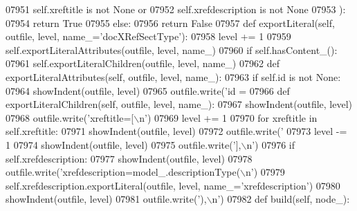 \begin{DoxyCode}
{{{{{{{{{{{{{{{{{{{{{{{{{{{{{{{{{{{{{{{{{{{{{{{{{{{{{{{{{{{{{{{{{{{{{{{{{{{{{{{{{{{{{{{{{{{{{{{{{{{{{{{{{{{{{{{{{{{{{{{{{{{{{{{{{{{{{{{{{{{{{{{{{{{{{{{{{{{{{{{{{{{{{{{{{{{{{{{{{{{{{{{{{{{{{{{{{{{{{{{{{{{{{{{{{{{{{{{{{{{{{{{{{{{{{{{{{{{{{{{{{{{{{{{{{{{{{{{{{{{{{{{{{{{{{{{{{{{{{{{{{{{{{{{{{{{{{{{{{{{{{{{{{{{{{{{{{{{{{{{{{{{{{{{{{{{{{{{{{{{{{{{{{{{{{{{{{{{{{{{{{{{{{{{{{{{{{{{{{{{{{{{{{{{{{{{{{{{{{{{{{{{{{{{{{{{{{{{{{{{{{{{{{{{{{{{{{{{{{{{{{{{{{{{{{{{{{{{{{{{{{{{{{{{{{{{{{{{{{{{{{{{{{{{{{{07951             self.xreftitle \textcolor{keywordflow}{is} \textcolor{keywordflow}{not} \textcolor{keywordtype}{None} \textcolor{keywordflow}{or}
07952             self.xrefdescription \textcolor{keywordflow}{is} \textcolor{keywordflow}{not} \textcolor{keywordtype}{None}
07953             ):
07954             \textcolor{keywordflow}{return} \textcolor{keyword}{True}
07955         \textcolor{keywordflow}{else}:
07956             \textcolor{keywordflow}{return} \textcolor{keyword}{False}
07957     \textcolor{keyword}{def }exportLiteral(self, outfile, level, name\_='docXRefSectType'):
07958         level += 1
07959         self.exportLiteralAttributes(outfile, level, name\_)
07960         \textcolor{keywordflow}{if} self.hasContent_():
07961             self.exportLiteralChildren(outfile, level, name\_)
07962     \textcolor{keyword}{def }exportLiteralAttributes(self, outfile, level, name\_):
07963         \textcolor{keywordflow}{if} self.id \textcolor{keywordflow}{is} \textcolor{keywordflow}{not} \textcolor{keywordtype}{None}:
07964             showIndent(outfile, level)
07965             outfile.write(\textcolor{stringliteral}{'id = %
07966     \textcolor{keyword}{def }exportLiteralChildren(self, outfile, level, name\_):
07967         showIndent(outfile, level)
07968         outfile.write(\textcolor{stringliteral}{'xreftitle=[\(\backslash\)n'})
07969         level += 1
07970         \textcolor{keywordflow}{for} xreftitle \textcolor{keywordflow}{in} self.xreftitle:
07971             showIndent(outfile, level)
07972             outfile.write(\textcolor{stringliteral}{'%
07973         level -= 1
07974         showIndent(outfile, level)
07975         outfile.write(\textcolor{stringliteral}{'],\(\backslash\)n'})
07976         \textcolor{keywordflow}{if} self.xrefdescription:
07977             showIndent(outfile, level)
07978             outfile.write(\textcolor{stringliteral}{'xrefdescription=model\_.descriptionType(\(\backslash\)n'})
07979             self.xrefdescription.exportLiteral(outfile, level, name\_=\textcolor{stringliteral}{'xrefdescription'})
07980             showIndent(outfile, level)
07981             outfile.write(\textcolor{stringliteral}{'),\(\backslash\)n'})
07982     \textcolor{keyword}{def }build(self, node\_):
}}}}}}}}}}}}}}}}}}}}}}}}}}}}}}}}}}}}}}}}}}}}}}}}}}}}}}}}}}}}}}}}}}}}}}}}}}}}}}}}}}}}}}}}}}}}}}}}}}}}}}}}}}}}}}}}}}}}}}}}}}}}}}}}}}}}}}}}}}}}}}}}}}}}}}}}}}}}}}}}}}}}}}}}}}}}}}}}}}}}}}}}}}}}}}}}}}}}}}}}}}}}}}}}}}}}}}}}}}}}}}}}}}}}}}}}}}}}}}}}}}}}}}}}}}}}}}}}}}}}}}}}}}}}}}}}}}}}}}}}}}}}}}}}}}}}}}}}}}}}}}}}}}}}}}}}}}}}}}}}}}}}}}}}}}}}}}}}}}}}}}}}}}}}}}}}}}}}}}}}}}}}}}}}}}}}}}}}}}}}}}}}}}}}}}}}}}}}}}}}}}}}}}}}}}}}}}}}}}}}}}}}}}}}}}}}}}}}}}}}}}}}}}}}}}}}}}}}}}}}}}}}}}}}}}}}}}}}}}}}}}}}}}}}}}}}
\end{DoxyCode}
